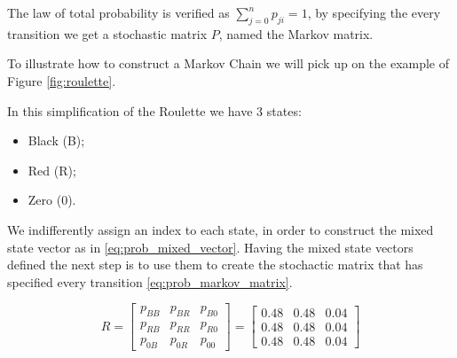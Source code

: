 The law of total probability is verified as $\sum_{j=0}^{n}p_{ji}=1$, by specifying the every transition we get a stochastic matrix $P$, named the Markov matrix.

To illustrate how to construct a Markov Chain we will pick up on the example of Figure \ref{fig:roulette}. 

In this simplification of the Roulette we have $3$ states:
\begin{itemize}
\item Black (B);
\item Red (R);
\item Zero (0).
\end{itemize}

We indifferently assign an index to each state, in order to construct the mixed state vector as in \ref{eq:prob_mixed_vector}. Having the mixed state vectors defined the next step is to use them to create the stochactic matrix that has specified every transition \ref{eq:prob_markov_matrix}.

\begin{equation}
\label{eq:prob_markov_matrix}
R=\left[\begin{array}{ccc}
p_{BB} & p_{BR} & p_{B0}\\
p_{RB} & p_{RR} & p_{R0}\\
p_{0B} & p_{0R} & p_{00}
\end{array}\right] = \left[\begin{array}{ccc}
0.48 & 0.48 & 0.04\\
0.48 & 0.48 & 0.04\\
0.48 & 0.48 & 0.04
\end{array}\right]
\end{equation}

